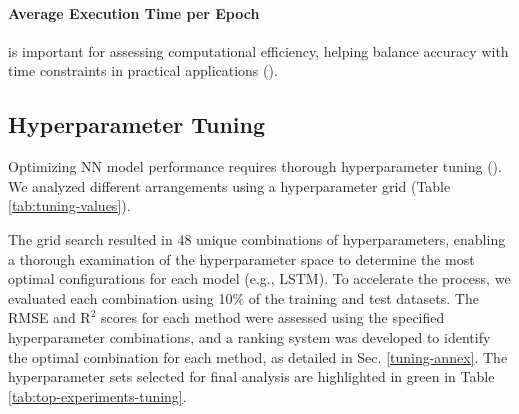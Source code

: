 \documentclass[journal,onecolumn]{IEEEtran}
\begin{document}
{\paragraph{Average Execution Time per Epoch}
is important for assessing computational efficiency, helping balance accuracy with time constraints in practical applications (\cite{jproc17sze}).

\subsection{Hyperparameter Tuning}
Optimizing NN model performance requires thorough hyperparameter tuning (\cite{mit16goodfellow}). We analyzed different arrangements using a hyperparameter grid (Table \ref{tab:tuning-values}).

The grid search resulted in 48 unique combinations of hyperparameters, enabling a thorough examination of the hyperparameter space to determine the most optimal configurations for each model (e.g., LSTM). To accelerate the process, we evaluated each combination using 10\% of the training and test datasets. The RMSE and $\text{R}^2$ scores for each method were assessed using the specified hyperparameter combinations, and a ranking system was developed to identify the optimal combination for each method, as detailed in Sec. \ref{tuning-annex}. The hyperparameter sets selected for final analysis are highlighted in green in Table \ref{tab:top-experiments-tuning}.

}
\end{document}
